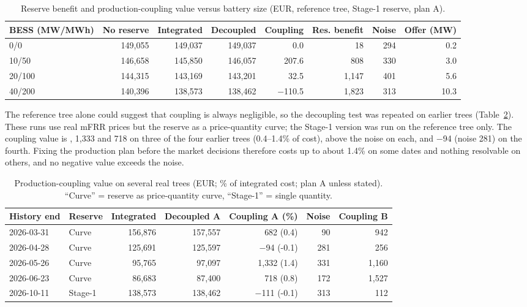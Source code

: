 \documentclass[journal]{IEEEtran}
\begin{document}
\begin{table}[t]
\caption{Reserve benefit and production-coupling value versus battery size (EUR, reference tree, Stage-1 reserve, plan A).}
\label{tab:coupling_sweep}
\centering
\scriptsize
\setlength{\tabcolsep}{2.5pt}
\begin{tabular}{@{}lrrrrrrr@{}}
\toprule
\textbf{BESS (MW/MWh)} & \textbf{No reserve} & \textbf{Integrated} & \textbf{Decoupled} & \textbf{Coupling} & \textbf{Res. benefit} & \textbf{Noise} & \textbf{Offer (MW)} \\
\midrule
0/0 & 149,055 & 149,037 & 149,037 & 0.0 & 18 & 294 & 0.2 \\
10/50 & 146,658 & 145,850 & 146,057 & 207.6 & 808 & 330 & 3.0 \\
20/100 & 144,315 & 143,169 & 143,201 & 32.5 & 1,147 & 401 & 5.6 \\
40/200 & 140,396 & 138,573 & 138,462 & $-$110.5 & 1,823 & 313 & 10.3 \\
\bottomrule
\end{tabular}
\end{table}

The reference tree alone could suggest that coupling is always negligible, so the decoupling test was repeated on earlier trees (Table~\ref{tab:coupling_dates}). These runs use real mFRR prices but the reserve as a price-quantity curve; the Stage-1 version was run on the reference tree only. The coupling value is , 1,333 and 718 on three of the four earlier trees (0.4--1.4\% of cost), above the noise on each, and $-$94 (noise 281) on the fourth. Fixing the production plan before the market decisions therefore costs up to about 1.4\% on some dates and nothing resolvable on others, and no negative value exceeds the noise.

\begin{table}[t]
\caption{Production-coupling value on several real trees (EUR; \% of integrated cost; plan A unless stated). ``Curve'' = reserve as price-quantity curve, ``Stage-1'' = single quantity.}
\label{tab:coupling_dates}
\centering
\scriptsize
\setlength{\tabcolsep}{2.5pt}
\begin{tabular}{@{}llrrrrr@{}}
\toprule
\textbf{History end} & \textbf{Reserve} & \textbf{Integrated} & \textbf{Decoupled A} & \textbf{Coupling A (\%)} & \textbf{Noise} & \textbf{Coupling B} \\
\midrule
2026-03-31 & Curve & 156,876 & 157,557 & 682 (0.4) & 90 & 942 \\
2026-04-28 & Curve & 125,691 & 125,597 & $-$94 (-0.1) & 281 & 256 \\
2026-05-26 & Curve & 95,765 & 97,097 & 1,332 (1.4) & 331 & 1,160 \\
2026-06-23 & Curve & 86,683 & 87,400 & 718 (0.8) & 172 & 1,527 \\
2026-10-11 & Stage-1 & 138,573 & 138,462 & $-$111 (-0.1) & 313 & 112 \\
\bottomrule
\end{tabular}
\end{table}
\end{document}

